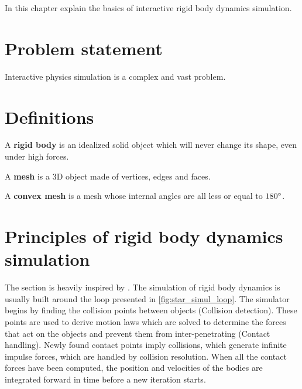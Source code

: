 In this chapter explain the basics of interactive rigid body dynamics simulation.

\section{Problem statement}
Interactive physics simulation is a complex and vast problem. 

\section{Definitions}
A \textbf{rigid body }is an idealized solid object which will never change its shape, even under high forces.

A \textbf{mesh} is a 3D object made of vertices, edges and faces. 

A \textbf{convex mesh} is a mesh whose internal angles are all less or equal to $180\degree$.

\section{Principles of rigid body dynamics simulation}
The section is heavily inspired by \cite{bender2014interactive}. The simulation of rigid body dynamics is usually built around the loop presented in \cref{fig:star_simul_loop}. The simulator begins by finding the collision points between objects (Collision detection). These points are used to derive motion laws which are solved to determine the forces that act on the objects and prevent them from inter-penetrating (Contact handling). Newly found contact points imply collisions, which generate infinite impulse forces, which are handled by collision resolution. When all the contact forces have been computed, the position and velocities of the bodies are integrated forward in time before a new iteration starts.

